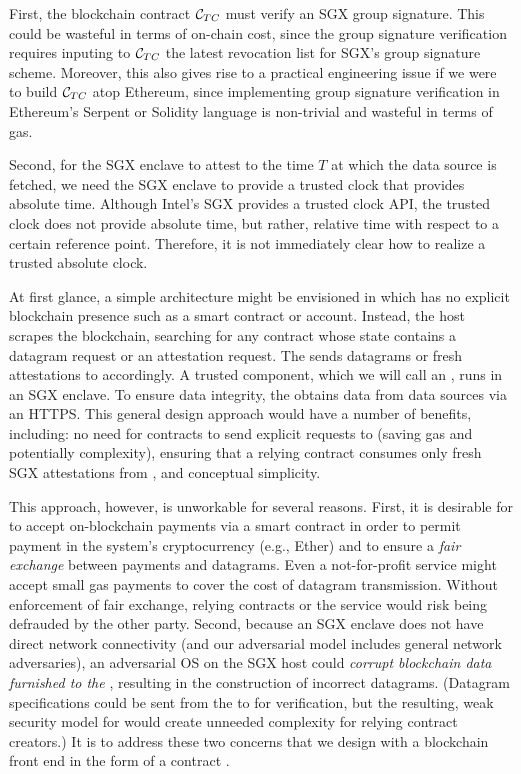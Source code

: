 First, the blockchain contract
${\cal C}_{TC}$ must verify an SGX group signature.  
This could be wasteful in terms of on-chain cost, 
since the group signature verification requires inputing 
to ${\cal C}_{TC}$ the latest revocation list 
for SGX's group signature scheme.
Moreover, 
this also gives rise to a practical engineering issue if we
were 
to build ${\cal C}_{TC}$ atop Ethereum,
since implementing group signature verification in Ethereum's Serpent
or Solidity language is non-trivial and wasteful in terms of gas.

Second, for the SGX enclave to  
attest to the time $T$ at which the data source is fetched, 
we need the SGX enclave to provide a trusted clock that provides absolute time. 
Although Intel's SGX provides a 
trusted clock API, the trusted clock does not provide absolute time,
but rather, relative time with respect to a certain reference point.  
Therefore, it is not immediately clear how to realize 
a trusted absolute clock.


\iffalse

At first glance, a simple architecture might be envisioned in which \tc has no explicit blockchain presence such as a smart contract or account. Instead, the \tc host scrapes the blockchain, searching for any contract \reqcont whose state contains a datagram request or an attestation request. The \tc sends datagrams or fresh attestations to \reqcont accordingly. A trusted component, which we will call an \encname, runs in an SGX enclave. To ensure data integrity, the \encname obtains data from data sources via an HTTPS. This general design approach would have a number of benefits, including: no need for contracts to send explicit requests to \tc (saving gas and potentially complexity), ensuring that a relying contract \reqcont consumes only fresh SGX attestations from \tc, and conceptual simplicity.

This approach, however, is unworkable for several reasons. First, it is desirable for \tc to accept on-blockchain payments via a smart contract in order to permit payment in the system's cryptocurrency (e.g., Ether) and to ensure a {\em fair exchange} between payments and datagrams. Even a not-for-profit \tc service might accept small gas payments to cover the cost of datagram transmission. Without enforcement of fair exchange, relying contracts or the \tc service would risk being defrauded by the other party. Second, because an SGX enclave does not have direct network connectivity (and our adversarial model includes general network adversaries), an adversarial OS on the SGX host could {\em corrupt blockchain data furnished to the \encname}, resulting in the construction of incorrect datagrams. (Datagram specifications could be sent from the \encname to \reqcont for verification, but the resulting, weak security model for \tc would create unneeded complexity for relying contract creators.) It is to address these two concerns that we design \tc with a blockchain front end in the form of a contract \tcont.

